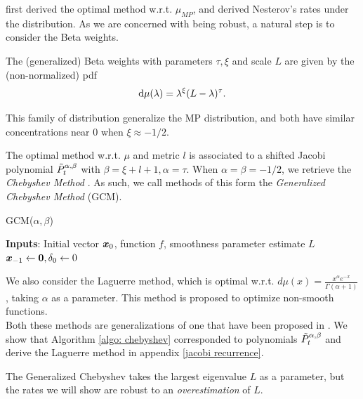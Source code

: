 \documentclass{article}
\begin{document}
\cite{pedregosa2020acceleration} first derived the optimal method w.r.t. $\mu_{MP}$, and \cite{paquette2020halting} derived Nesterov's rates under the distribution. As we are concerned with being robust, a natural step is to consider the Beta weights.
\begin{definition}
    The (generalized) Beta weights with parameters $\tau,\xi$ and scale $L$ are given by the (non-normalized) pdf
    \begin{equation}
        \mathop{}\!\mathrm{d}\mu(\lambda) = \lambda^\xi(L-\lambda)^\tau.
    \end{equation}
\end{definition} 
This family of distribution generalize the MP distribution, and both have similar concentrations near $0$ when $\xi\approx -1/2$.


The optimal method w.r.t. $\mu$ and metric $l$ is associated to a shifted Jacobi polynomial $\Tilde{P}_t^{\alpha,\beta}$ with $\beta=\xi+l+1, \alpha=\tau$. When $\alpha=\beta=-1/2$, we retrieve the \textit{Chebyshev Method} \citep{flanders1950numerical}. As such, we call methods of this form the \textit{Generalized Chebyshev Method} (GCM). 
\begin{algorithm}
\caption{GCM($\alpha,\beta$)}
\textbf{Inputs}: Initial vector ${\boldsymbol x}_0$, function $f$, smoothness parameter estimate $L$  \\


${\boldsymbol x}_{-1}\gets \textbf{0},\delta_0\gets0$   \\
 \label{algo: chebyshev}
\end{algorithm}

We  also consider the Laguerre method, which is optimal w.r.t. $d\mu(x)=\frac{x^\alpha e^{-x}}{\Gamma(\alpha+1)}$, taking $\alpha$ as a parameter. This method is proposed to optimize non-smooth functions.\\
Both these methods are generalizations of one that have been proposed in \cite{pedregosa2020acceleration}. We show that Algorithm \ref{algo: chebyshev} corresponded to polynomials $\Tilde{P}_t^{\alpha,\beta}$ and derive the Laguerre method in appendix \ref{jacobi recurrence}.\\
\begin{remark}
The Generalized Chebyshev takes the largest eigenvalue $L$ as a parameter, but the rates we will show are robust to an \textit{overestimation} of $L$.
\end{remark}
\end{document}
